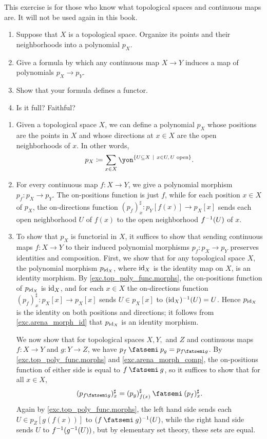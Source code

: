 \documentclass[Book-Poly]{subfiles}
\begin{document}
\begin{exercise} \label{exc.top_poly_func}
This exercise is for those who know what topological spaces and continuous maps are. It will not be used again in this book.
\begin{enumerate}
	\item Suppose that $X$ is a topological space. Organize its points and their neighborhoods into a polynomial $p_X$.
	\item Give a formula by which any continuous map $X\to Y$ induces a map of polynomials $p_X\to p_Y$.
	\item Show that your formula defines a functor.
	\item Is it full? Faithful?
\qedhere
\end{enumerate}
\begin{solution}
\begin{enumerate}
	\item Given a topological space $X$, we can define a polynomial $p_X$ whose positions are the points in $X$ and whose directions at $x \in X$ are the open neighborhoods of $x$.
	In other words,
	\[
	    p_X \coloneqq \sum_{x \in X} \yon^{\{ U \ss X \ | \ x \in U, \, U \text{ open} \}}.
	\]
	\item \label{exc.top_poly_func.morphs} For every continuous map $f \colon X \to Y$, we give a polynomial morphism $p_f \colon p_X \to p_Y$.
	The on-positions function is just $f$, while for each position $x \in X$ of $p_X$, the on-directions function $(p_f)^\sharp_x \colon p_Y[f(x)] \to p_X[x]$ sends each open neighborhood $U$ of $f(x)$ to the open neighborhood $f^{-1}(U)$ of $x$.
	
	\item To show that $p_X$ is functorial in $X$, it suffices to show that sending continuous maps $f \colon X \to Y$ to their induced polynomial morphisms $p_f \colon p_X \to p_Y$ preserves identities and composition.
	First, we show that for any topological space $X$, the polynomial morphism $p_{\mathrm{id}_X}$, where $\mathrm{id}_X$ is the identity map on $X$, is an identity morphism.
	By \cref{exc.top_poly_func.morphs}, the on-positions function of $p_{\mathrm{id}_X}$ is $\mathrm{id}_X$, and for each $x \in X$ the on-directions function $(p_f)^\sharp_x \colon p_X[x] \to p_X[x]$ sends $U \in p_X[x]$ to $(\mathrm{id}_X)^{-1}(U) = U$.
	Hence $p_{\mathrm{id}_X}$ is the identity on both positions and directions; it follows from \cref{exc.arena_morph_id} that $p_{\mathrm{id}_X}$ is an identity morphism.
	
	We now show that for topological spaces $X,Y,$ and $Z$ and continuous maps $f \colon X \to Y$ and $g \colon Y \to Z$, we have $p_f \then p_g = p_{f \then g}$.
	By \cref{exc.top_poly_func.morphs} and \cref{exc.arena_morph_comp}, the on-positions function of either side is equal to $f \then g$, so it suffices to show that for all $x \in X$,
	\[
	    (p_{f \then g})^\sharp_x = (p_g)^\sharp_{f(x)} \then (p_f)^\sharp_x.
	\]
	Again by \cref{exc.top_poly_func.morphs}, the left hand side sends each $U \in p_Z[g(f(x))]$ to $(f \then g)\inv(U)$, while the right hand side sends $U$ to $f^{-1}(g^{-1}(U))$, but by elementary set theory, these sets are equal.
	

\end{enumerate}
\end{solution}
\end{exercise}
\end{document}
